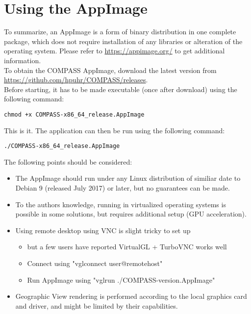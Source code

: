 \section{Using the AppImage}

To summarize, an AppImage is a form of binary distribution in one complete package, which does not require installation of any libraries or alteration of the operating system. 
Please refer to \url{https://appimage.org/} to get additional information. \\

To obtain the COMPASS AppImage, download the latest version from \url{https://github.com/hpuhr/COMPASS/releases}. \\

Before starting, it has to be made executable (once after download) using the following command:
\begin{lstlisting}
chmod +x COMPASS-x86_64_release.AppImage
\end{lstlisting}

This is it. The application can then be run using the following command:
\begin{lstlisting}
./COMPASS-x86_64_release.AppImage
\end{lstlisting}

The following points should be considered:

\begin{itemize}  
\item The AppImage should run under any Linux distribution of similiar date to Debian 9 (released July 2017) or later, but no guarantees can be made.
\item To the authors knowledge, running in virtualized operating systems is possible in some solutions, but requires additional setup (GPU acceleration).
\item Using remote desktop using VNC is slight tricky to set up
\begin{itemize}  
\item but a few users have reported VirtualGL + TurboVNC works well
\item Connect using "vglconnect user@remotehost"
\item Run AppImage using "vglrun ./COMPASS-version.AppImage"
\end{itemize} 
\item Geographic View rendering is performed according to the local graphics card and driver, and might be limited by their capabilities.
\end{itemize} 
